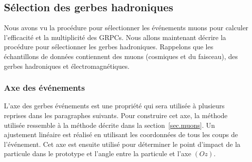 \subsection{Sélection des gerbes hadroniques}
\label{sec.pi_selection}
Nous avons vu la procédure pour sélectionner les événements muons pour calculer l'efficacité et la multiplicité des GRPCs. Nous allons maintenant décrire la procédure pour sélectionner les gerbes hadroniques. Rappelons que les échantillons de données contiennent des muons (cosmiques et du faisceau), des gerbes hadroniques et électromagnétiques.
\subsubsection{Axe des événements}
L'axe des gerbes événements est une propriété qui sera utilisée à plusieurs reprises dans les paragraphes suivants. Pour construire cet axe, la méthode utilisée ressemble à la méthode décrite dans la section~\ref{sec.muons}. Un ajustement linéaire est réalisé en utilisant les coordonnées de tous les coups de l'événement. Cet axe est ensuite utilisé pour déterminer le point d'impact de la particule dans le prototype et l'angle entre la particule et l'axe $(Oz)$.
